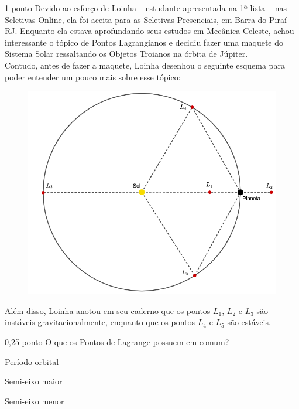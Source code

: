 \documentclass{../lista}
\begin{document}
	\begin{questao}{1 ponto}
		Devido ao esforço de Loinha -- estudante apresentada na 1ª lista -- nas Seletivas Online, ela foi aceita para as Seletivas Presenciais, em Barra do Piraí-RJ. Enquanto ela estava aprofundando seus estudos em Mecânica Celeste, achou interessante o tópico de Pontos Lagrangianos e decidiu fazer uma maquete do Sistema Solar ressaltando os Objetos Troianos na órbita de Júpiter. \\
		Contudo, antes de fazer a maquete, Loinha desenhou o seguinte esquema para poder entender um pouco mais sobre esse tópico:
		\begin{figure}[H]
			\centering
			\includegraphics[scale=0.5]{./img/3.png}
		\end{figure}
		Além disso, Loinha anotou em seu caderno que os pontos $L_1$, $L_2$ e $L_3$ são instáveis gravitacionalmente, enquanto que os pontos $L_4$ e $L_5$ são estáveis.

		\begin{pergunta}{0,25 ponto}
			O que os Pontos de Lagrange possuem em comum?


			\begin{alternativas}
				\alternativaMarcada Período orbital
				\item Semi-eixo maior
				\item Semi-eixo menor 
			\end{alternativas}
		\end{pergunta}


\end{questao}
\end{document}
